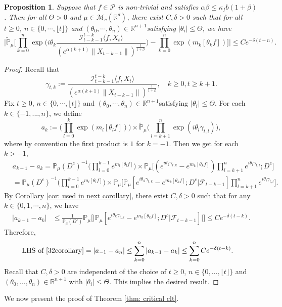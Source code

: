 \documentclass[12pt,a4paper]{amsart}
\theoremstyle{plain}
\newtheorem{prop}[thm]{Proposition}
\theoremstyle{definition}
\numberwithin{equation}{section}
\begin{document}
\begin{prop}
  \label{cor: indepedent of the limit zeta for critical and small}
  Suppose that $f\in \mathcal{P}$ is non-trivial and satisfies $\alpha\beta\leq\kappa_fb(1+\beta)$.
  Then for all $\Theta >0$ and $\mu\in \mathcal M_c(\mathbb R^d)$, there exist $C,\delta>0$ such that for all $t\geq 0$, $n \in \{0, \cdots, \lfloor t \rfloor\}$ and $(\theta_0, \cdots, \theta_n)\in \mathbb R^{n+1}$satisfying $|\theta_i|\leq \Theta$, we have
\begin{equation}
  \label{32corollary}
  \Big|\mathbb{\widetilde{P}}_{\mu}\Big[\prod_{k=0}^n\exp\Big(i\theta_k \frac {\mathcal I_{t-k-1}^{t-k}\langle f ,X_t\rangle}{(e^{\alpha (k+1)}\|X_{t-k-1}\|)^\frac{1}{1+\beta}}\Big)-\prod_{k=0}^n\exp(m_k[\theta_k f])\Big]\Big|\leq C e^{-\delta(t-n)}.
\end{equation}
\end{prop}
\begin{proof}
  Recall that \[\gamma_{t,k}:=\frac {\mathcal I_{t-k-1}^{t-k}\langle f ,X_t\rangle}{(e^{\alpha( k+1)}\|X_{t-k-1}\|)^\frac{1}{1+\beta}},\quad k \geq 0, t\geq k+1. \]
  Fix $t\geq 0$, $n \in \{0, \cdots, \lfloor t \rfloor\}$ and $(\theta_0, \cdots, \theta_n)\in \mathbb R^{n+1}$satisfying $|\theta_i|\leq \Theta$.
  For each $k\in\{-1,...,n\}$, we define
  \[
    a_k
    :=\Big(\prod_{l=0}^{k}\exp(m_l[\theta_lf])\Big) \times \mathbb{\widetilde{P}}_{\mu}\Big(\prod_{l=k+1}^{n}\exp\left(i\theta_l\gamma_{t,l}\right)\Big),
  \]
  where by convention the first product is $1$ for $k=-1$. Then we get for each $k > -1$,
  \begin{align}
    & a_{k-1} - a_k
    =\mathbb{P}_{\mu}(D^c)^{-1}\Big(\prod_{l=0}^{k-1}e^{m_l[\theta_l f]}\Big) \times \mathbb{P}_{\mu}\Big[(e^{i\theta_{k}\gamma_{t,k}}-e^{m_k[\theta_k f]})\prod_{l=k+1}^ne^{i\theta_{l}\gamma_{t,l}};D^c\Big] \\ 
    & =\mathbb{P}_{\mu}(D^c)^{-1} \Big(\prod_{l=0}^{k-1}e^{m_l[\theta_l f]}\Big) \times \mathbb{P}_{\mu}\Big[\mathbb P_\mu[e^{i\theta_{k}\gamma_{t,k}}-e^{m_k[\theta_k f]}; D^c|\mathscr F_{t-k-1}]\prod_{l=k+1}^ne^{i\theta_{l}\gamma_{t,l}}\Big].
  \end{align}
  By Corollary \ref{cor: used in next corollary}, there exist $C,\delta>0$ such that for any $k\in\{0, 1, \cdots, n\}$, we have
  \begin{align}
    | a_{k-1} - a_k|
    & \leq \frac{1}{\mathbb{P}_{\mu}(D^c)}\mathbb{P}_{\mu}\Big[\big|\mathbb P_\mu[e^{i\theta_{k}\gamma_{t,k}}-e^{m_k[\theta_k f]}; D^c\big|\mathscr{F}_{t-k-1}]\big|\Big]
    \leq C e^{-\delta(t-k)}.
  \end{align}
  Therefore,
  \begin{align}
    \text{LHS of \eqref{32corollary}}
    & = \left|a_{-1}-a_n\right|
    \leq \sum_{k=0}^n\left|a_{k-1}-a_k\right|
    \leq \sum_{k=0}^n C e^{-\delta(t-k)}.
  \end{align}
	Recall that $C, \delta>0$ are independent of the choice of $t\geq 0$, $n \in \{0,...,\lfloor t \rfloor\}$ and $(\theta_0,...,\theta_n)\in \mathbb R^{n+1}$ with $|\theta_i|\leq \Theta$.
  This implies the desired result.
\end{proof}
We now present the proof of Theorem \ref{thm: critical clt}.
\medskip
\end{document}

